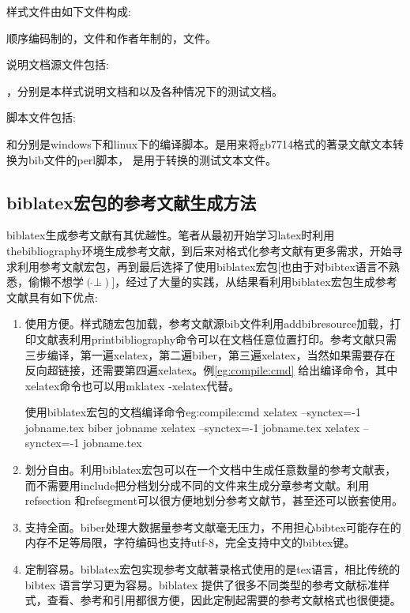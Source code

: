 样式文件由如下文件构成:

顺序编码制的，文件和作者年制的，文件。

说明文档源文件包括:

，分别是本样式说明文档和以及各种情况下的测试文档。

脚本文件包括:

和分别是windows下和linux下的编译脚本。是用来将gb7714格式的著录文献文本转换为bib文件的perl脚本，
是用于转换的测试文本文件。

\subsection{biblatex宏包的参考文献生成方法}
biblatex生成参考文献有其优越性。笔者从最初开始学习latex时利用thebibliography环境生成参考文献，到后来对格式化参考文献有更多需求，开始寻求利用参考文献宏包，再到最后选择了使用biblatex宏包[也由于对bibtex语言不熟悉，偷懒不想学$( \hat{} \bot \hat{} )$]，经过了大量的实践，从结果看利用biblatex宏包生成参考文献具有如下优点:

\begin{enumerate}
\item 使用方便。样式随宏包加载，参考文献源bib文件利用addbibresource加载，打印文献表利用printbibliography命令可以在文档任意位置打印。参考文献只需三步编译，第一遍xelatex，第二遍biber，第三遍xelatex，当然如果需要存在反向超链接，还需要第四遍xelatex。例\ref{eg:compile:cmd} 给出编译命令，其中xelatex命令也可以用mklatex -xelatex代替。

    \begin{codetex}{使用biblatex宏包的文档编译命令}{eg:compile:cmd}
    xelatex --synctex=-1 jobname.tex
    biber jobname
    xelatex --synctex=-1 jobname.tex
    xelatex --synctex=-1 jobname.tex
    \end{codetex}

\item 划分自由。利用biblatex宏包可以在一个文档中生成任意数量的参考文献表，而不需要用include把分档划分成不同的文件来生成分章参考文献。利用refsection 和refsegment可以很方便地划分参考文献节，甚至还可以嵌套使用。

\item 支持全面。biber处理大数据量参考文献毫无压力，不用担心bibtex可能存在的内存不足等局限，字符编码也支持utf-8，完全支持中文的bibtex键。

\item 定制容易。biblatex宏包实现参考文献著录格式使用的是tex语言，相比传统的bibtex 语言学习更为容易。biblatex 提供了很多不同类型的参考文献标准样式，查看、参考和引用都很方便，因此定制起需要的参考文献格式也很便捷。
\end{enumerate}

